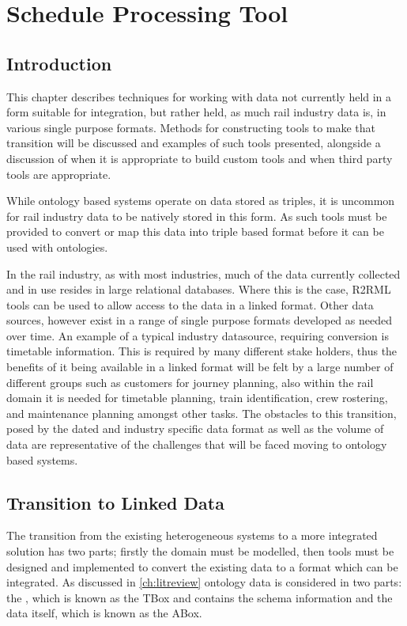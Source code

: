 \chapter{Schedule Processing Tool}\label{ch:cifparser}
 \section{Introduction}
This chapter describes techniques for working with data not currently held in a form suitable for integration, but rather held, as much rail industry data is, in various single purpose formats. Methods for constructing tools to make that transition will be discussed and examples of such tools presented, alongside a discussion of when it is appropriate to build custom tools and when third party tools are appropriate. 

While ontology based systems operate on data stored as triples, it is uncommon for rail industry data to be natively stored in this form. As such tools must be provided to convert or map this data into triple based format before it can be used with ontologies. 

In the rail industry, as with most industries, much of the data currently collected and in use resides in large relational databases. Where this is the case, R2RML tools can be used to allow access to the data in a linked format. Other data sources, however exist in a range of single purpose formats developed as needed over time. An example of a typical industry datasource, requiring conversion is timetable information. This is required by many different stake holders, thus the benefits of it being available in a linked format will be felt by a large number of different groups such as customers for journey planning, also within the rail domain it is needed for timetable planning, train identification, crew rostering, and maintenance planning amongst other tasks. The obstacles to this transition, posed by the dated and industry specific data format as well as the volume of data are representative of the challenges that will be faced moving to ontology based systems. 

\section{Transition to Linked Data}
The transition from the existing heterogeneous systems to a more integrated solution has two parts; firstly the domain must be modelled, then tools must be designed and implemented to convert the existing data to a format which can be integrated. As discussed in \autoref{ch:litreview} ontology data is considered in two parts: the , which is known as the TBox and contains the schema information and the data itself, which is known as the ABox. 

